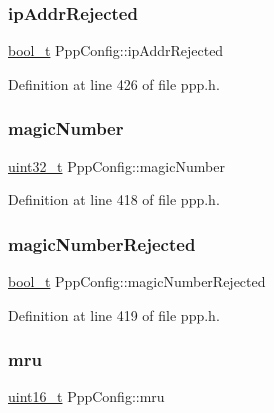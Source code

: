 \subsubsection{\texorpdfstring{ip\+Addr\+Rejected}{ipAddrRejected}}
{\footnotesize\ttfamily \hyperlink{compiler__port_8h_a812d16e5494522586b3784e55d479912}{bool\+\_\+t} Ppp\+Config\+::ip\+Addr\+Rejected}



Definition at line 426 of file ppp.\+h.

\mbox{\label{structPppConfig_a5379f3472512e2da57444f37419b3c9d}} 
\subsubsection{\texorpdfstring{magic\+Number}{magicNumber}}
{\footnotesize\ttfamily \hyperlink{stdint_8h_a435d1572bf3f880d55459d9805097f62}{uint32\+\_\+t} Ppp\+Config\+::magic\+Number}



Definition at line 418 of file ppp.\+h.

\mbox{\label{structPppConfig_a6ab4dc6247e97ec52863a6ff545bc929}} 
\subsubsection{\texorpdfstring{magic\+Number\+Rejected}{magicNumberRejected}}
{\footnotesize\ttfamily \hyperlink{compiler__port_8h_a812d16e5494522586b3784e55d479912}{bool\+\_\+t} Ppp\+Config\+::magic\+Number\+Rejected}



Definition at line 419 of file ppp.\+h.

\mbox{\label{structPppConfig_a14db665ffdc3ab8fc29cbd32faa1c455}} 
\subsubsection{\texorpdfstring{mru}{mru}}
{\footnotesize\ttfamily \hyperlink{stdint_8h_a273cf69d639a59973b6019625df33e30}{uint16\+\_\+t} Ppp\+Config\+::mru}



